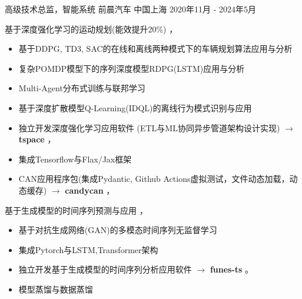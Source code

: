\documentclass[../cv_cn.tex]{subfiles}
\begin{document}


\begin{cventries}

	\cventry
	{高级技术总监，智能系统} %
	{前晨汽车} %
	{中国上海} %
	{2020年11月 - 2024年5月} %
	{
		\begin{cvitems} %
			\item 基于深度强化学习的运动规划(能效提升20\%) \supercite{Xin_VEOS_22} \supercite{Xin_Fu_Pan_Simulation_Test_RL_22} \supercite{Pan_Xin_DrvStyle_23}，
			\begin{itemize}
				\item 基于DDPG, TD3, SAC的在线和离线两种模式下的车辆规划算法应用与分析
				\item 复杂POMDP模型下的序列深度模型RDPG(LSTM)应用与分析
				\item Multi-Agent分布式训练与联邦学习
				\item 基于深度扩散模型Q-Learning(IDQL)的离线行为模式识别与应用
				\item 独立开发深度强化学习应用软件 (ETL与ML协同异步管道架构设计实现) $\rightarrow$ \textbf{tspace} \href{https://binjian.github.io/tspace/}{\faGithub}，
				\item 集成Tensorflow与Flax/Jax框架
				\item CAN应用程序包(集成Pydantic, Github Actions虚拟测试，文件动态加载，动态缓存) $\rightarrow$ \textbf{candycan} \href{https://binjian.github.io/candycan/}{\faGithub}，
			\end{itemize}
			\item 基于生成模型的时间序列预测与应用 \supercite{Xin_GenAI_23} \supercite{Xin_Chen_NN_TSFeatures_23}，
			\begin{itemize}
				\item 基于对抗生成网络(GAN)的多模态时间序列无监督学习
				\item 集成Pytorch与LSTM,Transformer架构
				\item 独立开发基于生成模型的时间序列分析应用软件 $\rightarrow$ \textbf{funes-ts} \href{https://github.com/binjian/funes-ts/}{\faGithub}。
				\item 模型蒸馏与数据蒸馏

\end{itemize}
\end{cvitems}}
\end{cventries}
\end{document}
